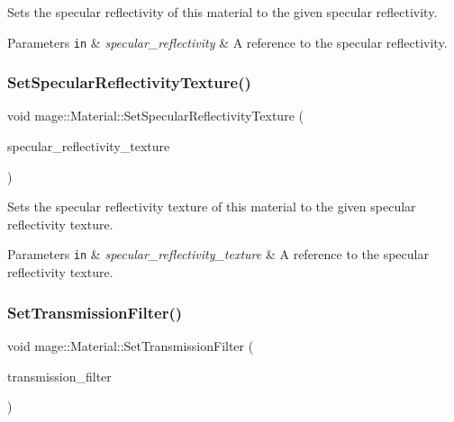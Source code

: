 Sets the specular reflectivity of this material to the given specular reflectivity.


\begin{DoxyParams}[1]{Parameters}
\mbox{\tt in}  & {\em specular\+\_\+reflectivity} & A reference to the specular reflectivity. \\
\hline
\end{DoxyParams}
\hypertarget{structmage_1_1_material_a130430244dfd0b5866b00fca523e874c}{}\label{structmage_1_1_material_a130430244dfd0b5866b00fca523e874c} 
\subsubsection{\texorpdfstring{Set\+Specular\+Reflectivity\+Texture()}{SetSpecularReflectivityTexture()}}
{\footnotesize\ttfamily void mage\+::\+Material\+::\+Set\+Specular\+Reflectivity\+Texture (\begin{DoxyParamCaption}\item[{\hyperlink{namespacemage_a1e01ae66713838a7a67d30e44c67703e}{Shared\+Ptr}$<$ \hyperlink{classmage_1_1_texture}{Texture} $>$}]{specular\+\_\+reflectivity\+\_\+texture }\end{DoxyParamCaption})}

Sets the specular reflectivity texture of this material to the given specular reflectivity texture.


\begin{DoxyParams}[1]{Parameters}
\mbox{\tt in}  & {\em specular\+\_\+reflectivity\+\_\+texture} & A reference to the specular reflectivity texture. \\
\hline
\end{DoxyParams}
\hypertarget{structmage_1_1_material_afe8121e13eb9fff9ffb281e7c807f2e0}{}\label{structmage_1_1_material_afe8121e13eb9fff9ffb281e7c807f2e0} 
\subsubsection{\texorpdfstring{Set\+Transmission\+Filter()}{SetTransmissionFilter()}\hspace{0.1cm}{\footnotesize\ttfamily [1/2]}}
{\footnotesize\ttfamily void mage\+::\+Material\+::\+Set\+Transmission\+Filter (\begin{DoxyParamCaption}\item[{const \hyperlink{structmage_1_1_r_g_b_spectrum}{R\+G\+B\+Spectrum} \&}]{transmission\+\_\+filter }\end{DoxyParamCaption})\hspace{0.3cm}{\ttfamily [noexcept]}}

